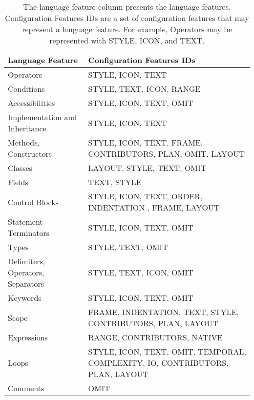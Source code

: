 \begin{table}[H]
\centering
\begin{tabular}{|l|p{11cm}|}
\hline
{\bf Language Feature}            & {\bf Configuration Features IDs}                                              \\ \hline
Operators                         & STYLE, ICON, TEXT                                                             \\ \hline
Conditions                        & STYLE, TEXT, ICON, RANGE                                                      \\ \hline
Accessibilities                   & STYLE, ICON, TEXT, OMIT                                                       \\ \hline
Implementation and Inheritance    & STYLE, ICON, TEXT                                                             \\ \hline
Methods, Constructors             & STYLE, ICON, TEXT, FRAME, CONTRIBUTORS, PLAN, OMIT, LAYOUT                    \\ \hline
Classes                           & LAYOUT, STYLE, TEXT, OMIT                                                     \\ \hline
Fields                            & TEXT, STYLE                                                                   \\ \hline
Control Blocks                    & STYLE, ICON, TEXT, ORDER, INDENTATION , FRAME, LAYOUT                         \\ \hline
Statement Terminators             & STYLE, ICON, TEXT, OMIT                                                       \\ \hline
Types                             & STYLE, TEXT, OMIT                                                             \\ \hline
Delimiters, Operators, Separators & STYLE, TEXT, ICON, OMIT                                                       \\ \hline
Keywords                          & STYLE, ICON, TEXT, OMIT                                                       \\ \hline
Scope                             & FRAME, INDENTATION, TEXT, STYLE, CONTRIBUTORS, PLAN, LAYOUT                   \\ \hline
Expressions                       & RANGE, CONTRIBUTORS, NATIVE                                                   \\ \hline
Loops                             & STYLE, ICON, TEXT, OMIT, TEMPORAL, COMPLEXITY, IO, CONTRIBUTORS, PLAN, LAYOUT \\ \hline
Comments                          & OMIT                                                                          \\ \hline
\end{tabular}
\caption{The language feature column presents the language features. Configuration Features IDs are a set of configuration features that may represent a language feature. For example, Operators may be represented with STYLE, ICON, and TEXT.}
\label{tab15}
\end{table}
